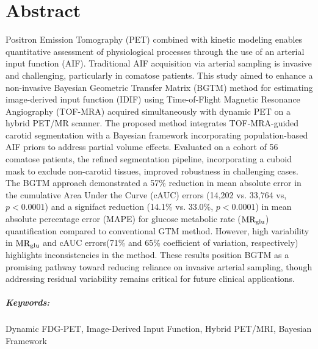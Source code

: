 \chapter*{Abstract}

Positron Emission Tomography (PET) combined with kinetic modeling enables quantitative assessment of physiological processes through the use of an arterial input function (AIF).
Traditional AIF acquisition via arterial sampling is invasive and challenging, particularly in comatose patients.
This study aimed to enhance a non-invasive Bayesian Geometric Transfer Matrix (BGTM) method for estimating image-derived input function (IDIF) using Time-of-Flight Magnetic Resonance Angiography (TOF-MRA) acquired simultaneously with dynamic PET on a hybrid PET/MR scanner.
The proposed method integrates TOF-MRA-guided carotid segmentation with a Bayesian framework incorporating population-based AIF priors to address partial volume effects.
Evaluated on a cohort of 56 comatose patients, the refined segmentation pipeline, incorporating a cuboid mask to exclude non-carotid tissues, improved robustness in challenging cases.
The BGTM approach demonstrated a 57\% reduction in mean absolute error in the cumulative Area Under the Curve (cAUC) errors (14,202 vs. 33,764 vs, $p<0.0001$) and a signifact reduction (14.1\% vs. 33.0\%, $p<0.0001$) in mean absolute percentage error (MAPE) for glucose metabolic rate ($\text{MR}_{\text{glu}}$) quantification compared to conventional GTM method.
However, high variability in $\text{MR}_{\text{glu}}$ and cAUC errors(71\% and 65\% coefficient of variation, respectively) highlights inconsistencies in the method.
These results position BGTM as a promising pathway toward reducing reliance on invasive arterial sampling, though addressing residual variability remains critical for future clinical applications.

\paragraph{Keywords:} Dynamic FDG-PET, Image-Derived Input Function, Hybrid PET/MRI, Bayesian Framework

